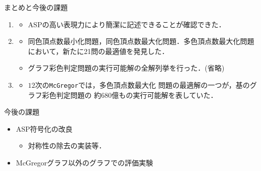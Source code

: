 \documentclass[dvipdfmx,11pt]{beamer}
\newcommand{\code}[1]{\lstinline[basicstyle=\ttfamily]{#1}}
\begin{document}
\begin{frame}{まとめと今後の課題}
 \begin{enumerate}
  \item {}
        \begin{itemize}
         \item ASPの高い表現力により簡潔に記述できることが確認できた．
        \end{itemize}
  \item {}
        \begin{itemize}
         \item 同色頂点数最小化問題，同色頂点数最大化問題．多色頂点数最大化問題
               において，新たに21問の最適値を発見した．
         \item グラフ彩色判定問題の実行可能解の全解列挙を行った．(省略)
        \end{itemize}
  \item {}
        \begin{itemize}
	 \item $12$次の\code{McGregor}では，多色頂点数最大化
	       問題の最適解の一つが，基のグラフ彩色判定問題の
	       約680億もの実行可能解を表していた．
        \end{itemize}
 \end{enumerate}

 \begin{block}{今後の課題}
  \begin{itemize}
   \item ASP符号化の改良
         \begin{itemize}
          \item 対称性の除去の実装等．
         \end{itemize}
   \item McGregorグラフ以外のグラフでの評価実験
  \end{itemize}
 \end{block}
\end{frame}
\end{document}
